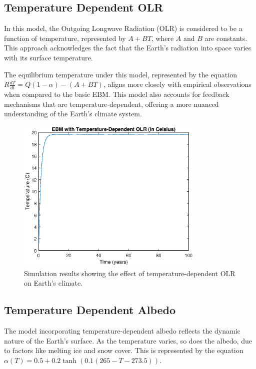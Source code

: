 \documentclass[12pt]{article}
\begin{document}
\subsection{Temperature Dependent OLR}
In this model, the Outgoing Longwave Radiation (OLR) 
is considered to be a function of temperature, 
represented by \( A + BT \), 
where \( A \) and \( B \) are constants. 
This approach acknowledges the fact that the Earth's radiation 
into space varies with its surface temperature. 

The equilibrium temperature under this model, 
represented by the equation 
\( R\frac{dT}{dt} = Q(1 - \alpha) - (A + BT) \), 
aligns more closely with empirical observations 
when compared to the basic EBM. 
This model also accounts for feedback mechanisms 
that are temperature-dependent, 
offering a more nuanced understanding of the Earth's climate system. 

\begin{figure}[ht]
\centering
\includegraphics[width=0.8\textwidth]{images/temperature_dependent_OLR.eps}
\caption{Simulation results showing the effect of temperature-dependent OLR on Earth's climate.}
\label{fig:tempDepOLR}
\end{figure}

\subsection{Temperature Dependent Albedo}
The model incorporating temperature-dependent albedo 
reflects the dynamic nature of the Earth's surface. 
As the temperature varies, so does the albedo, 
due to factors like melting ice and snow cover. 
This is represented by the equation 
\( \alpha(T) = 0.5 + 0.2 \tanh(0.1(265 - T - 273.5)) \).
\end{document}
